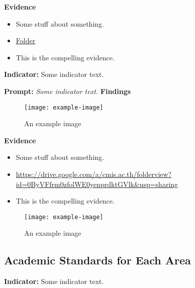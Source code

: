 \documentclass{report}
\begin{document}
\noindent\textbf{Evidence}
\vspace{-\topsep}

\begin{itemize}[leftmargin=*]
\setlength{\parskip}{0pt}
\setlength{\itemsep}{0pt plus 1pt}
\item Some stuff about something.
\item \href{https://drive.google.com/a/cmis.ac.th/folderview?id=0ByVFfrm0zfolWE0yenprdktGVlk&usp=sharing}{Folder}
\item This is the compelling evidence.
\end{itemize}

\noindent\textbf{Indicator:} Some indicator text.

\noindent\textbf{Prompt:} \textit{Some indicator text.}
\noindent\textbf{Findings}

\blindtext

\blinditemize[6]

\blindtext

\begin{figure}[h!]
\caption[An example image]{An example image}
\centering
\texttt{[image: example-image]}
\end{figure}


\noindent\textbf{Evidence}
\vspace{-\topsep}

\begin{itemize}[leftmargin=*]
\setlength{\parskip}{0pt}
\setlength{\itemsep}{0pt plus 1pt}
\item Some stuff about something.
\item \url{https://drive.google.com/a/cmis.ac.th/folderview?id=0ByVFfrm0zfolWE0yenprdktGVlk&usp=sharing}
\item This is the compelling evidence.
\end{itemize}

\begin{figure}[h!]
\caption[An example image]{An example image}
\centering
\texttt{[image: example-image]}
\end{figure}


\subsection{Academic Standards for Each Area}
\blindtext

\blindtext
 
\noindent\textbf{Indicator:} Some indicator text.
\end{document}
